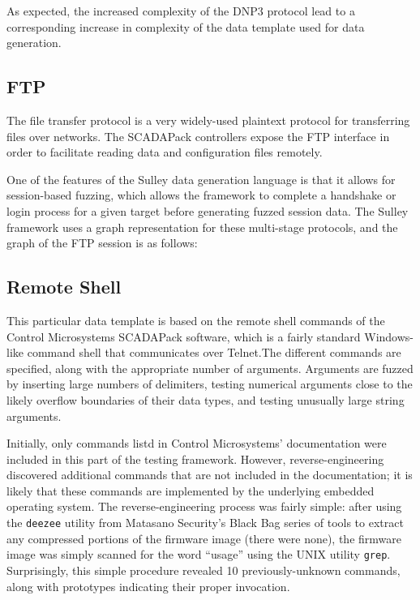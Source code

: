 \documentclass{report}
\begin{document}
As expected, the increased complexity of the DNP3 protocol lead to a corresponding increase in complexity of the data template used for data generation.

\subsection{FTP}

The file transfer protocol is a very widely-used plaintext protocol for transferring files over networks. The SCADAPack controllers
expose the FTP interface in order to facilitate reading data and configuration files remotely.

One of the features of the Sulley data generation language is that it allows for session-based fuzzing, which allows the framework to
complete a handshake or login process for a given target before generating fuzzed session data. The Sulley framework uses a graph representation
for these multi-stage protocols, and the graph of the FTP session is as follows:

\subsection{Remote Shell}

This particular data template is based on the remote shell commands of the Control Microsystems SCADAPack software, which is a fairly
standard Windows-like command shell that communicates over Telnet.The different commands
are specified, along with the appropriate number of arguments. Arguments are fuzzed by inserting large numbers of delimiters, testing numerical
arguments close to the likely overflow boundaries of their data types, and testing unusually large string arguments.

Initially, only commands listd in Control Microsystems' documentation were included in this part of the testing framework. However, reverse-engineering
discovered additional commands that are not included in the documentation; it is likely that these commands are implemented by the underlying embedded operating
system. The reverse-engineering process was fairly simple: after using the \texttt{deezee} utility from Matasano Security's Black Bag series of tools to
extract any compressed portions of the firmware image (there were none), the firmware image was simply scanned for the word ``usage'' using the UNIX
utility \texttt{grep}. Surprisingly, this simple procedure revealed 10 previously-unknown commands, along with prototypes indicating their proper
invocation.
\end{document}
